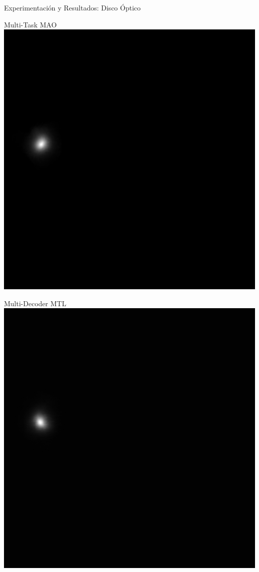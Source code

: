 \documentclass[xcolor=dvipsnames,table]{beamer}
\begin{document}
\begin{frame}{Experimentación y Resultados: Disco Óptico}
\begin{minipage}[b]{0.13\textwidth}
	\end{minipage}\hfill
	\begin{minipage}[b]{0.13\textwidth}
		\centering
		Multi-Task MAO\\[0.2cm]
		\includegraphics[width=\linewidth]{my_images/video/ODTASKMAO.jpg}
	\end{minipage}\hfill
	\begin{minipage}[b]{0.13\textwidth}
		\centering
		Multi-Decoder MTL\\[0.2cm]
		\includegraphics[width=\linewidth]{my_images/video/ODMULTIMTL.jpg}

\end{minipage}
\end{frame}
\end{document}
